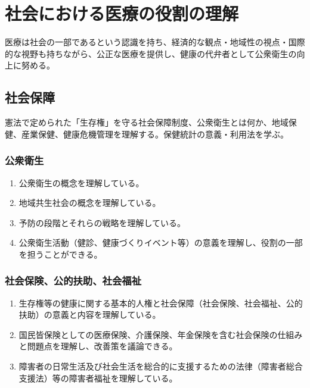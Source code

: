 \newpage

\hypertarget{ux793eux4f1aux306bux304aux3051ux308bux533bux7642ux306eux5f79ux5272ux306eux7406ux89e3}{%
\section{社会における医療の役割の理解}\label{ux793eux4f1aux306bux304aux3051ux308bux533bux7642ux306eux5f79ux5272ux306eux7406ux89e3}}

医療は社会の一部であるという認識を持ち、経済的な観点・地域性の視点・国際的な視野も持ちながら、公正な医療を提供し、健康の代弁者として公衆衛生の向上に努める。

\hypertarget{ux793eux4f1aux4fddux969c}{%
\subsection{社会保障}\label{ux793eux4f1aux4fddux969c}}

憲法で定められた「生存権」を守る社会保障制度、公衆衛生とは何か、地域保健、産業保健、健康危機管理を理解する。保健統計の意義・利用法を学ぶ。

\hypertarget{ux516cux8846ux885bux751f}{%
\subsubsection{公衆衛生}\label{ux516cux8846ux885bux751f}}

\begin{enumerate}
\def\labelenumi{\arabic{enumi}.}
\tightlist
\item
  公衆衛生の概念を理解している。
\item
  地域共生社会の概念を理解している。
\item
  予防の段階とそれらの戦略を理解している。
\item
  公衆衛生活動（健診、健康づくりイベント等）の意義を理解し、役割の一部を担うことができる。
\end{enumerate}

\hypertarget{ux793eux4f1aux4fddux967aux516cux7684ux6276ux52a9ux793eux4f1aux798fux7949}{%
\subsubsection{社会保険、公的扶助、社会福祉}\label{ux793eux4f1aux4fddux967aux516cux7684ux6276ux52a9ux793eux4f1aux798fux7949}}

\begin{enumerate}
\def\labelenumi{\arabic{enumi}.}
\tightlist
\item
  生存権等の健康に関する基本的人権と社会保障（社会保険、社会福祉、公的扶助）の意義と内容を理解している。
\item
  国民皆保険としての医療保険、介護保険、年金保険を含む社会保険の仕組みと問題点を理解し、改善策を議論できる。
\item
  障害者の日常生活及び社会生活を総合的に支援するための法律（障害者総合支援法）等の障害者福祉を理解している。
\end{enumerate}

